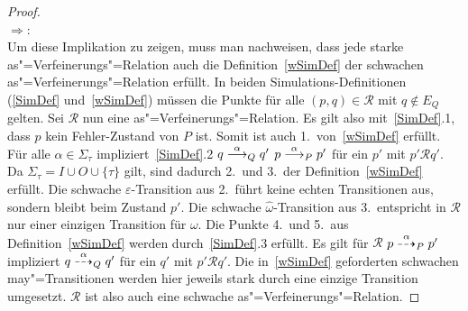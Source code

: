 \begin{proof}\mbox{}\\
  \glqq $\Rightarrow$\grqq{}:\\
  Um diese Implikation zu zeigen, muss man nachweisen, dass jede starke
  as"=Verfeinerungs"=Relation auch die Definition~\ref{wSimDef} der schwachen
  as"=Verfeinerungs"=Relation erfüllt. In beiden Simulations-Definitionen
  (\ref{SimDef} und~\ref{wSimDef}) müssen die Punkte für alle $(p,q) \in
  \mathcal{R}$ mit $q\notin E_Q$ gelten. Sei $\mathcal{R}$ nun eine
  as"=Verfeinerungs"=Relation. Es gilt also mit~\ref{SimDef}.1, dass $p$ kein
  Fehler-Zustand von $P$ ist. Somit ist auch 1.\ von~\ref{wSimDef} erfüllt. Für
  alle $\alpha\in\Sigma _{\tau}$ impliziert~\ref{SimDef}.2 $q \must[\alpha]_Q
  q'$ $p\must[\alpha]_P p'$ für ein $p'$ mit $p'\mathcal{R} q'$. Da $\Sigma
  _{\tau} = I \cup O \cup \{\tau\}$ gilt, sind dadurch 2.\ und 3.\ der
  Definition~\ref{wSimDef} erfüllt. Die schwache $\varepsilon$-Transition aus
  2.\ führt keine echten Transitionen aus, sondern bleibt beim Zustand $p'$.
  Die schwache $\hat{\omega}$-Transition aus 3.\ entspricht in $\mathcal{R}$
  nur einer einzigen Transition für $\omega$. Die Punkte 4.\ und 5.\ aus
  Definition~\ref{wSimDef} werden durch~\ref{SimDef}.3 erfüllt. Es gilt für
  $\mathcal{R}$ $p\may[\alpha]_P p'$ impliziert $q \may[\alpha]_Q q'$ für ein
  $q'$ mit $p'\mathcal{R}q'$. Die in~\ref{wSimDef} geforderten schwachen
  may"=Transitionen werden hier jeweils stark durch eine einzige Transition
  umgesetzt. $\mathcal{R}$ ist also auch eine schwache
  as"=Verfeinerungs"=Relation.


\end{proof}
